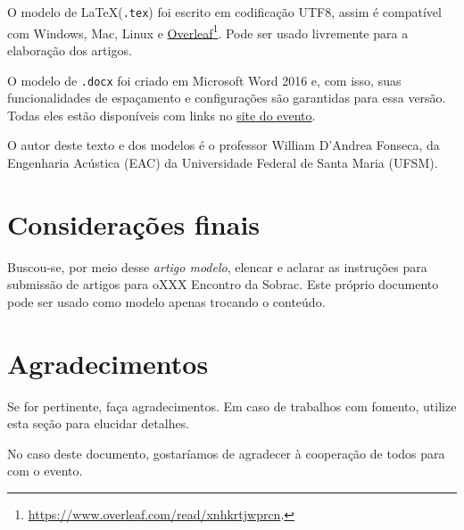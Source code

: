 \documentclass[12pt, a4paper, twoside, onecolumn]{article}
\begin{document}
O modelo de \LaTeX\xspace (\texttt{.tex}) foi escrito em codificação UTF8, assim é compatível com Windows, Mac, Linux e \href{https://www.overleaf.com/read/xnhkrtjwprcn}{Overleaf}\footnote{\url{https://www.overleaf.com/read/xnhkrtjwprcn}.}. Pode ser usado livremente para a elaboração dos artigos.

O modelo de \texttt{.docx} foi criado em Microsoft Word 2016 e, com isso, suas funcionalidades de espaçamento e configurações são garantidas para essa versão. Todas eles estão disponíveis com links no \href{https://www.even3.com.br/sobracnatal2023}{site do evento}.

O autor deste texto e dos modelos é o professor William D'Andrea Fonseca, da Engenharia Acústica (EAC) da Universidade Federal de Santa Maria (UFSM).

\section{Considerações finais}

Buscou-se, por meio desse \textit{artigo modelo}, elencar e aclarar as instruções para submissão de artigos para o\linebreak XXX Encontro da Sobrac. 
Este próprio documento pode ser usado como modelo apenas trocando o conteúdo.

\section{Agradecimentos}

Se for pertinente, faça agradecimentos.
%
Em caso de trabalhos com fomento, utilize esta seção para elucidar detalhes.

No caso deste documento, gostaríamos de agradecer à cooperação de todos para com o evento.

\renewcommand{\refname}{Referências} \addcontentsline{toc}{section}{\refname}%
 
{\footnotesize }
\appendix
\end{document}
